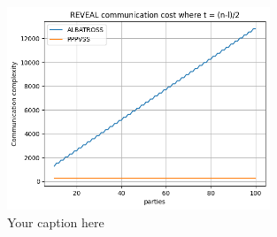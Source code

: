 \begin{figure}[htbp]
  \centering
  \includegraphics[width=0.7\textwidth]{reveal_comm.png}
  \caption{Your caption here}
  \label{fig:your-label}
\end{figure}